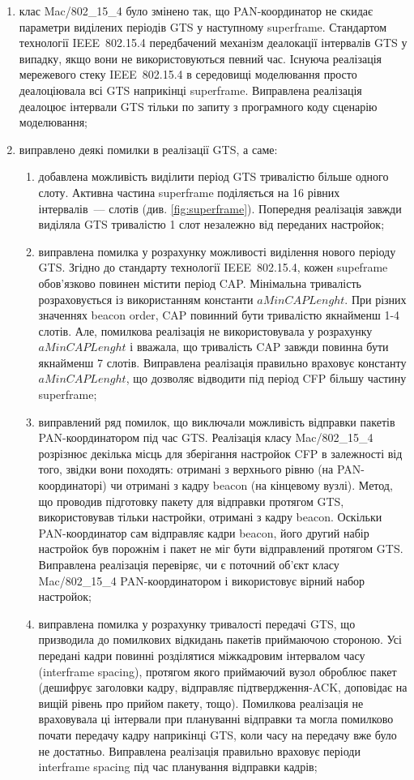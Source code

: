 \documentclass[a4paper,ukrainian,utf8,nocolumnsxix,nocolumnxxxii,nocolumnxxxi,floatsection,equationsection]{eskdtext}
\newcommand{\iee}[0]{IEEE~802.15.4\xspace}
\begin{document}
\begin{enumerate}
	\item клас Mac/802\_15\_4 було змінено так, що PAN-координатор не скидає параметри виділених періодів GTS у наступному superframe. Стандартом технології \iee передбачений механізм деалокації інтервалів GTS у випадку, якщо вони не використовуються певний час. Існуюча реалізація мережевого стеку \iee в середовищі моделювання просто деалоціювала всі GTS наприкінці superframe. Виправлена реалізація деалоцює інтервали GTS тільки по запиту з програмного коду сценарію моделювання;

	\item виправлено деякі помилки в реалізації GTS, а саме:
	\begin{enumerate}
		\item добавлена можливість виділити період GTS тривалістю більше одного слоту. Активна частина superframe поділяється на 16 рівних інтервалів~--- слотів (див. \cref{fig:superframe}). Попередня реалізація завжди виділяла GTS тривалістю 1 слот незалежно від переданих настройок;

		\item виправлена помилка у розрахунку можливості виділення нового періоду GTS. Згідно до стандарту технології \iee, кожен supeframe обов'язково повинен містити період CAP. Мінімальна тривалість розраховується із використанням константи $aMinCAPLenght$. При різних значеннях beacon order, CAP повинний бути тривалістю якнайменш 1-4 слотів. Але, помилкова реалізація не використовувала у розрахунку $aMinCAPLenght$ і вважала, що тривалість CAP завжди повинна бути якнайменш 7 слотів. Виправлена реалізація правильно враховує константу $aMinCAPLenght$, що дозволяє відводити під період CFP більшу частину superframe;

		\item виправлений ряд помилок, що виключали можливість відправки пакетів PAN-координатором під час GTS. Реалізація класу Mac/802\_15\_4 розрізнює декілька місць для зберігання настройок CFP в залежності від того, звідки вони походять: отримані з верхнього рівню (на PAN-координаторі) чи отримані з кадру beacon (на кінцевому вузлі). Метод, що проводив підготовку пакету для відправки протягом GTS, використовував тільки настройки, отримані з кадру beacon. Оскільки PAN-координатор сам відправляє кадри beacon, його другий набір настройок був порожнім і пакет не міг бути відправлений протягом GTS. Виправлена реалізація перевіряє, чи є поточний об'єкт класу Mac/802\_15\_4 PAN-координатором і використовує вірний набор настройок;

		\item виправлена помилка у розрахунку тривалості передачі GTS, що призводила до помилкових відкидань пакетів приймаючою стороною. Усі передані кадри повинні розділятися міжкадровим інтервалом часу (interframe spacing), протягом якого приймаючий вузол оброблює пакет (дешифрує заголовки кадру, відправляє підтвердження-ACK, доповідає на вищій рівень про прийом пакету, тощо). Помилкова реалізація не враховувала ці інтервали при плануванні відправки та могла помилково почати передачу кадру наприкінці GTS, коли часу на передачу вже було не достатньо. Виправлена реалізація правильно враховує періоди interframe spacing під час планування відправки кадрів;


\end{enumerate}
\end{enumerate}
\end{document}
